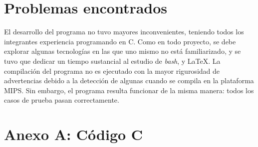 \documentclass[a4paper,10pt]{article}
\begin{document}
    \section{Problemas encontrados}
El desarrollo del programa no tuvo mayores inconvenientes, teniendo todos los integrantes experiencia programando en C. Como en todo proyecto, se debe explorar algunas tecnologías en las que uno mismo no está familiarizado, y se tuvo que dedicar un tiempo sustancial al estudio de \textit{bash}, y \LaTeX. La compilación del programa no es ejecutado con la mayor rigurosidad de advertencias debido a la detección de algunas cuando se compila en la plataforma MIPS. Sin embargo, el programa resulta funcionar de la misma manera: todos los casos de prueba pasan correctamente.
    \newpage
   
     \section{Anexo A: Código C}
\end{document}
